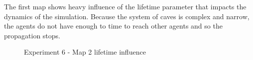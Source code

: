 The first map shows heavy influence of the lifetime parameter that impacts the dynamics of the simulation.
Because the system of caves is complex and narrow, the agents do not have enough to time to reach other agents and so the propagation stops.

\begin{figure}[H]
    \centering

    \hspace*{\fill}

    \hspace*{\fill}

    \caption{Experiment 6 - Map 2 lifetime influence}\label{fig:map2_lifetime}
\end{figure}

